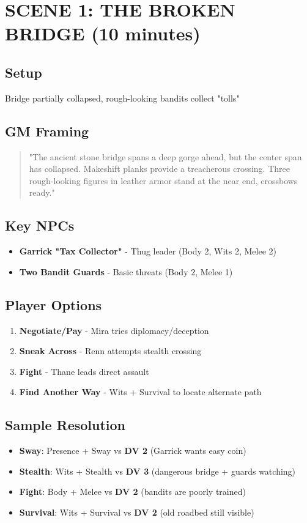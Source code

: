 \documentclass[12pt]{article}
\newcommand{\dv}[1]{\textbf{DV #1}}
\begin{document}
\section{SCENE 1: THE BROKEN BRIDGE (10 minutes)}

\subsection*{Setup}
Bridge partially collapsed, rough-looking bandits collect "tolls"

\subsection*{GM Framing}
\begin{quote}
"The ancient stone bridge spans a deep gorge ahead, but the center span has collapsed. Makeshift planks provide a treacherous crossing. Three rough-looking figures in leather armor stand at the near end, crossbows ready."
\end{quote}

\subsection*{Key NPCs}
\begin{itemize}
\item \textbf{Garrick "Tax Collector"} - Thug leader (Body 2, Wits 2, Melee 2)
\item \textbf{Two Bandit Guards} - Basic threats (Body 2, Melee 1)
\end{itemize}

\subsection*{Player Options}
\begin{enumerate}
\item \textbf{Negotiate/Pay} - Mira tries diplomacy/deception
\item \textbf{Sneak Across} - Renn attempts stealth crossing  
\item \textbf{Fight} - Thane leads direct assault
\item \textbf{Find Another Way} - Wits + Survival to locate alternate path
\end{enumerate}

\subsection*{Sample Resolution}
\begin{itemize}
\item \textbf{Sway}: Presence + Sway vs \dv{2} (Garrick wants easy coin)
\item \textbf{Stealth}: Wits + Stealth vs \dv{3} (dangerous bridge + guards watching)
\item \textbf{Fight}: Body + Melee vs \dv{2} (bandits are poorly trained)
\item \textbf{Survival}: Wits + Survival vs \dv{2} (old roadbed still visible)
\end{itemize}
\end{document}

